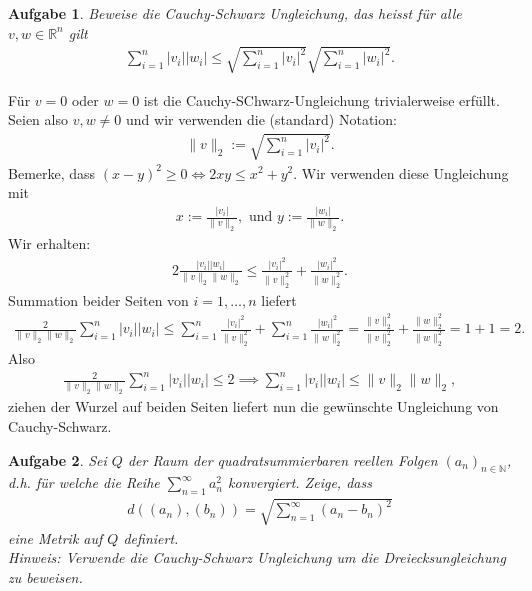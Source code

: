 \documentclass[a4paper, 20]{exam}
\newtheorem{ex}{Aufgabe}
\begin{document}
\begin{ex} Beweise die Cauchy-Schwarz Ungleichung, das heisst für alle $v,w \in \mathbb{R}^n$ gilt
\begin{align*}
\sum_{i=1}^n |v_i||w_i| \leq \sqrt{\sum_{i=1}^n |v_i|^2} \sqrt{\sum_{i=1}^n |w_i|^2}.
\end{align*}
\end{ex}

\begin{solution} Für $v=0$ oder $w=0$ ist die Cauchy-SChwarz-Ungleichung trivialerweise erfüllt. Seien also $v,w \neq 0$ und wir verwenden die (standard) Notation:
\begin{align*}
\|v\|_2:= \sqrt{\sum_{i=1}^n |v_i|^2}.
\end{align*}
Bemerke, dass $(x-y)^2 \geq 0 \iff 2xy \leq x^2+y^2$. Wir verwenden diese Ungleichung mit 
\begin{align*}
x:= \frac{|v_i|}{\|v\|_2}, \text{ und } y:= \frac{|w_i|}{\|w\|_2}.
\end{align*}
Wir erhalten:
\begin{align*}
2 \frac{|v_i||w_i|}{\|v\|_2\|w\|_2} \leq \frac{|v_i|^2}{\|v\|_2^2}+ \frac{|w_i|^2}{\|w\|_2^2}.
\end{align*}
Summation beider Seiten von $i=1, \dots , n$ liefert
\begin{align*}
\frac{2}{\|v\|_2 \|w\|_2} \sum_{i=1}^n |v_i| |w_i| \leq \sum_{i=1}^n \frac{|v_i|^2}{\|v\|_2^2} + \sum_{i=1}^n \frac{|w_i|^2}{\|w\|_2^2} = \frac{\|v\|_2^2}{\|v\|_2^2}+ \frac{\|w\|_2^2}{\|w\|_2^2}= 1+1=2.
\end{align*}
Also
\begin{align*}
\frac{2}{\|v\|_2 \|w\|_2} \sum_{i=1}^n |v_i| |w_i| \leq 2 \implies \sum_{i=1}^n |v_i||w_i| \leq \|v\|_2 \|w\|_2,
\end{align*}
ziehen der Wurzel auf beiden Seiten liefert nun die gewünschte Ungleichung von Cauchy-Schwarz. 
\end{solution}

\begin{ex} Sei $Q$ der Raum der quadratsummierbaren reellen Folgen $(a_n)_{n \in \mathbb{N}}$, d.h. für welche die Reihe $\sum_{n=1}^\infty a_n^2$ konvergiert. Zeige, dass
\begin{align*}
d((a_n), (b_n))= \sqrt{ \sum_{n=1}^\infty (a_n-b_n)^2}
\end{align*}
eine Metrik auf $Q$ definiert. \\
Hinweis: Verwende die Cauchy-Schwarz Ungleichung um die Dreiecksungleichung zu beweisen.
\end{ex}
\end{document}
